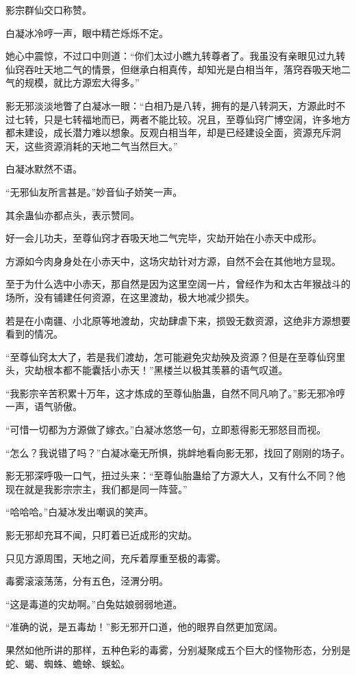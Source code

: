 \begin{this_body}
影宗群仙交口称赞。

白凝冰冷哼一声，眼中精芒烁烁不定。

她心中震惊，不过口中则道：“你们太过小瞧九转尊者了。我虽没有亲眼见过九转仙窍吞吐天地二气的情景，但继承白相真传，却知光是白相当年，落窍吞吸天地二气的规模，就比方源宏大得多。”

影无邪淡淡地瞥了白凝冰一眼：“白相乃是八转，拥有的是八转洞天，方源此时不过七转，只是七转福地而已，两者不能比较。况且，至尊仙窍广博空阔，许多地方都未建设，成长潜力难以想象。反观白相当年，却是已经建设全面，资源充斥洞天，这些资源消耗的天地二气当然巨大。”

白凝冰默然不语。

“无邪仙友所言甚是。”妙音仙子娇笑一声。

其余蛊仙亦都点头，表示赞同。

好一会儿功夫，至尊仙窍才吞吸天地二气完毕，灾劫开始在小赤天中成形。

方源如今肉身身处在小赤天中，这场灾劫针对方源，自然不会在其他地方显现。

至于为什么选中小赤天，那自然是因为这里空阔一片，曾经作为和太古年猴战斗的场所，没有铺建任何资源，在这里渡劫，极大地减少损失。

若是在小南疆、小北原等地渡劫，灾劫肆虐下来，损毁无数资源，这绝非方源想要看到的情况。

“至尊仙窍太大了，若是我们渡劫，怎可能避免灾劫殃及资源？但是在至尊仙窍里头，灾劫根本都不能囊括小赤天！”黑楼兰以极其羡慕的语气叹道。

“我影宗辛苦积累十万年，这才炼成的至尊仙胎蛊，自然不同凡响了。”影无邪冷哼一声，语气骄傲。

“可惜一切都为方源做了嫁衣。”白凝冰悠悠一句，立即惹得影无邪怒目而视。

“怎么？我说错了吗？”白凝冰毫无所惧，挑衅地看向影无邪，找回了刚刚的场子。

影无邪深呼吸一口气，扭过头来：“至尊仙胎蛊给了方源大人，又有什么不同？他现在就是我影宗宗主，我们都是同一阵营。”

“哈哈哈。”白凝冰发出嘲讽的笑声。

影无邪却充耳不闻，只盯着已近成形的灾劫。

只见方源周围，天地之间，充斥着厚重至极的毒雾。

毒雾滚滚荡荡，分有五色，泾渭分明。

“这是毒道的灾劫啊。”白兔姑娘弱弱地道。

“准确的说，是五毒劫！”影无邪开口道，他的眼界自然更加宽阔。

果然如他所讲的那样，五种色彩的毒雾，分别凝聚成五个巨大的怪物形态，分别是蛇、蝎、蜘蛛、蟾蜍、蜈蚣。


\end{this_body}
